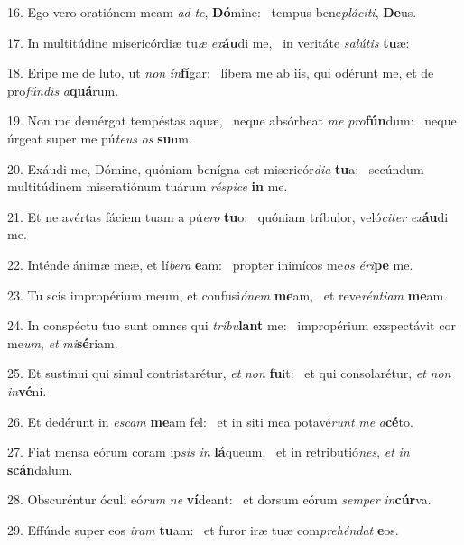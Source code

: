 16. Ego vero oratiónem meam \textit{ad} \textit{te}, \textbf{Dó}mine: \ast\  tempus bene\textit{plá}\textit{ci}\textit{ti}, \textbf{De}us.\

17. In multitúdine misericórdiæ tu\textit{æ} \textit{ex}\textbf{áu}di me, \ast\  in veritáte \textit{sa}\textit{lú}\textit{tis} \textbf{tu}æ:\

18. Eripe me de luto, ut \textit{non} \textit{in}\textbf{fí}gar: \ast\  líbera me ab iis, qui odérunt me, et de pro\textit{fún}\textit{dis} \textit{a}\textbf{quá}rum.\

19. Non me demérgat tempéstas aquæ, \dag\  neque absórbeat \textit{me} \textit{pro}\textbf{fún}dum: \ast\  neque úrgeat super me pú\textit{te}\textit{us} \textit{os} \textbf{su}um.\

20. Exáudi me, Dómine, quóniam benígna est misericór\textit{di}\textit{a} \textbf{tu}a: \ast\  secúndum multitúdinem miseratiónum tuárum \textit{ré}\textit{spi}\textit{ce} \textbf{in} me.\

21. Et ne avértas fáciem tuam a pú\textit{e}\textit{ro} \textbf{tu}o: \ast\  quóniam tríbulor, veló\textit{ci}\textit{ter} \textit{ex}\textbf{áu}di me.\

22. Inténde ánimæ meæ, et lí\textit{be}\textit{ra} \textbf{e}am: \ast\  propter inimícos me\textit{os} \textit{é}\textit{ri}\textbf{pe} me.\

23. Tu scis impropérium meum, et confusi\textit{ó}\textit{nem} \textbf{me}am, \ast\  et reve\textit{rén}\textit{ti}\textit{am} \textbf{me}am.\

24. In conspéctu tuo sunt omnes qui \textit{trí}\textit{bu}\textbf{lant} me: \ast\  impropérium exspectávit cor me\textit{um}, \textit{et} \textit{mi}\textbf{sé}riam.\

25. Et sustínui qui simul contristarétur, \textit{et} \textit{non} \textbf{fu}it: \ast\  et qui consolarétur, \textit{et} \textit{non} \textit{in}\textbf{vé}ni.\

26. Et dedérunt in \textit{es}\textit{cam} \textbf{me}am fel: \ast\  et in siti mea potavé\textit{runt} \textit{me} \textit{a}\textbf{cé}to.\

27. Fiat mensa eórum coram ip\textit{sis} \textit{in} \textbf{lá}queum, \ast\  et in retributió\textit{nes}, \textit{et} \textit{in} \textbf{scán}dalum.\

28. Obscuréntur óculi eó\textit{rum} \textit{ne} \textbf{ví}deant: \ast\  et dorsum eórum \textit{sem}\textit{per} \textit{in}\textbf{cúr}va.\

29. Effúnde super eos \textit{i}\textit{ram} \textbf{tu}am: \ast\  et furor iræ tuæ com\textit{pre}\textit{hén}\textit{dat} \textbf{e}os.\

